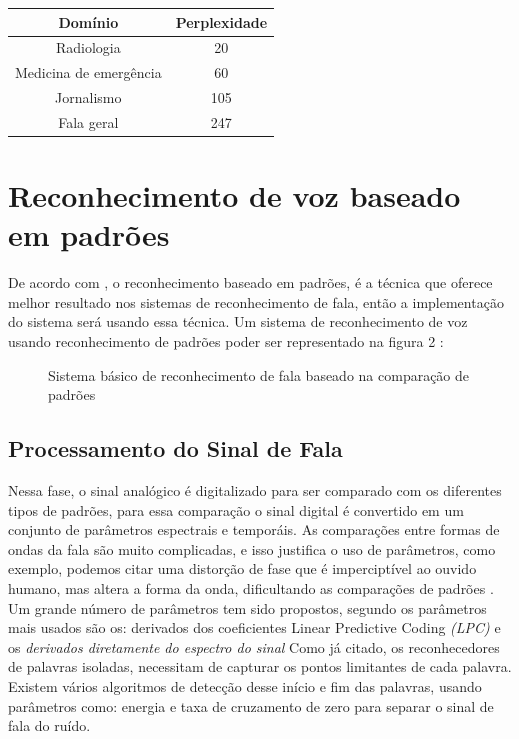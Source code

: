\begin{enumerate}[A)]
\begin{table}[H]
\begin{tabular}{cc}
\hline %

Domínio & Perplexidade \\ %

\hline
\hline

Radiologia & 20 \\
Medicina de emergência & 60 \\
Jornalismo & 105 \\
Fala geral & 247 \\ 
\hline
\end{tabular}
\label{tab}
\end{table}


\end{enumerate}

\section{Reconhecimento de voz baseado em padrões}\label{sec:red_neu}
De acordo com , o reconhecimento baseado em padrões, é a técnica que oferece melhor resultado nos sistemas de reconhecimento de fala, então a implementação do sistema será usando essa técnica.
Um sistema de reconhecimento de voz usando reconhecimento de padrões poder ser representado na figura 2 \cite{FundamentRabiner}:
 
\begin{figure}[H]
\centering

\caption{Sistema básico de reconhecimento de fala baseado na comparação de padrões}
\end{figure}

\subsection{Processamento do Sinal de Fala}
Nessa fase, o sinal analógico é digitalizado para ser comparado com os diferentes tipos de padrões, para essa comparação o sinal digital é convertido em um conjunto de parâmetros espectrais e temporáis. As comparações entre formas de ondas da fala são muito complicadas, e isso justifica o uso de parâmetros, como exemplo, podemos citar uma distorção de fase que é imperciptível ao ouvido humano, mas altera a forma da onda, dificultando as comparações de padrões \cite{AvaliaTecJose}.
Um grande número de parâmetros tem sido propostos, segundo  os parâmetros mais usados são os: derivados dos coeficientes Linear Predictive Coding \textit{(LPC)} e os \textit{derivados diretamente do espectro do sinal}
Como já citado, os reconhecedores de palavras isoladas, necessitam de capturar os pontos limitantes de cada palavra. Existem vários algoritmos de detecção desse início e fim das palavras, usando parâmetros como: energia e taxa de cruzamento de zero para separar o sinal de fala do ruído.

